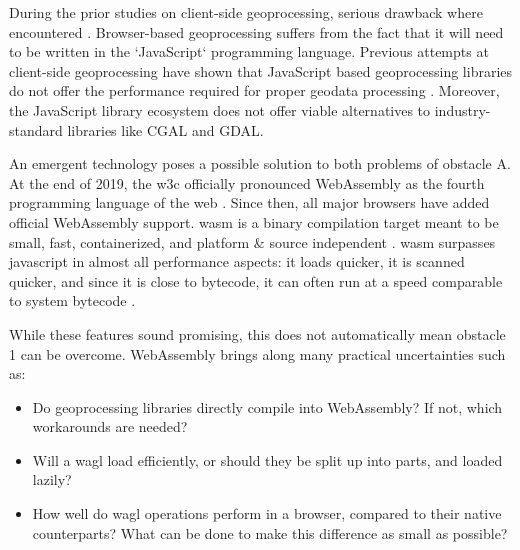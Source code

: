 During the prior studies on client-side geoprocessing, serious drawback where encountered \cite{panidi_hybrid_2015, hamilton_client-side_2014}. Browser-based geoprocessing suffers from the fact that it will need to be written in the `JavaScript` programming language. Previous attempts at client-side geoprocessing have shown that JavaScript based geoprocessing libraries do not offer the performance required for proper geodata processing \cite{hamilton_client-side_2014}. 
Moreover, the JavaScript library ecosystem does not offer viable alternatives to industry-standard libraries like CGAL and GDAL. 

An emergent technology poses a possible solution to both problems of obstacle A. At the end of 2019, the \ac{w3c} officially pronounced WebAssembly as the fourth programming language of the web \cite{w3c_world_2019}. Since then, all major browsers have added official WebAssembly support. \ac{wasm} is a binary compilation target meant to be small, fast, containerized, and platform \& source independent \cite{haas_bringing_2017}. \ac{wasm} surpasses javascript in almost all performance aspects: it loads quicker, it is scanned quicker, and since it is close to bytecode, it can often run at a speed comparable to system bytecode \cite{jangda_not_2019}. 

While these features sound promising, this does not automatically mean obstacle 1 can be overcome. WebAssembly brings along many practical uncertainties such as:

\begin{itemize}
  \item Do geoprocessing libraries directly compile into WebAssembly? If not, which workarounds are needed? 
  \item Will a \ac{wagl} load efficiently, or should they be split up into parts, and loaded lazily? 
  \item How well do \ac{wagl} operations perform in a browser, compared to their native counterparts? What can be done to make this difference as small as possible?
\end{itemize}

